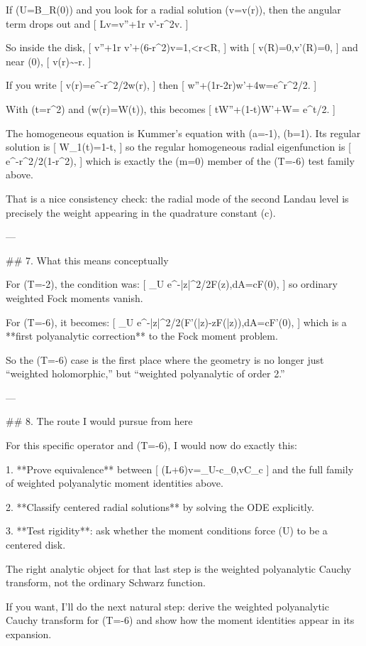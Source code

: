If (U=B_R(0)) and you look for a radial solution (v=v(r)), then the angular term drops out and
[
Lv=v''+\frac1r v'-r^2v.
]

So inside the disk,
[
v''+\frac1r v'+(6-r^2)v=1,<r<R,
]
with
[
v(R)=0,\qquad v'(R)=0,
]
and near (0),
[
v(r)\sim -\log r.
]

If you write
[
v(r)=e^{-r^2/2}w(r),
]
then
[
w''+\Big(\frac1r-2r\Big)w'+4w=e^{r^2/2}.
]

With (t=r^2) and (w(r)=W(t)), this becomes
[
tW''+(1-t)W'+W= e^{t/2}.
]

The homogeneous equation is Kummer’s equation with (a=-1), (b=1).
Its regular solution is
[
W_1(t)=1-t,
]
so the regular homogeneous radial eigenfunction is
[
e^{-r^2/2}(1-r^2),
]
which is exactly the (m=0) member of the (T=-6) test family above.

That is a nice consistency check: the radial mode of the second Landau level is precisely the weight appearing in the quadrature constant (c).

---

## 7. What this means conceptually

For (T=-2), the condition was:
[
\int_U e^{-|z|^2/2}F(z),dA=cF(0),
]
so ordinary weighted Fock moments vanish.

For (T=-6), it becomes:
[
\int_U e^{-|z|^2/2}\big(F'(\bar z)-zF(\bar z)\big),dA=cF'(0),
]
which is a **first polyanalytic correction** to the Fock moment problem.

So the (T=-6) case is the first place where the geometry is no longer just “weighted holomorphic,” but “weighted polyanalytic of order 2.”

---

## 8. The route I would pursue from here

For this specific operator and (T=-6), I would now do exactly this:

1. **Prove equivalence** between
   [
   (L+6)v=_U-c\delta_0,\quad v\in C_c
   ]
   and the full family of weighted polyanalytic moment identities above.

2. **Classify centered radial solutions** by solving the ODE explicitly.

3. **Test rigidity**: ask whether the moment conditions force (U) to be a centered disk.

The right analytic object for that last step is the weighted polyanalytic Cauchy transform, not the ordinary Schwarz function.

If you want, I’ll do the next natural step: derive the weighted polyanalytic Cauchy transform for (T=-6) and show how the moment identities appear in its expansion.

